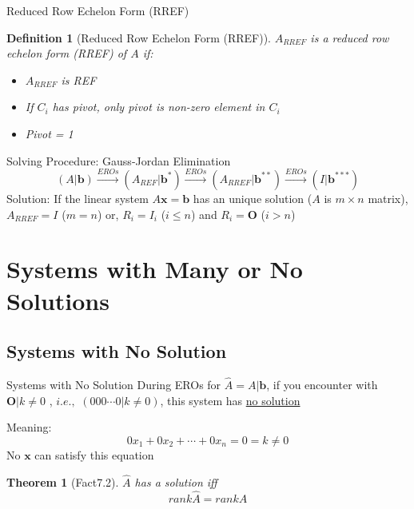 \documentclass[final]{beamer}
\newtheorem{defn}{Definition}
\newtheorem{thm}{Theorem}
\begin{document}
\begin{frame}[t]{Reduced Row Echelon Form (RREF)}
	\begin{defn}
		[Reduced Row Echelon Form (RREF)]
		$A_{RREF}$ is a reduced row echelon form (RREF) of $A$ if:
		\begin{itemize}
			\item $A_{RREF}$ is REF
			\item If $C_i$ has pivot, only pivot is non-zero element in $C_i$
			\item Pivot = 1
		\end{itemize}
	\end{defn}
	\begin{block}
		{Solving Procedure: Gauss-Jordan Elimination}
		\[
			(A\vert \mathbf{b}) \xrightarrow{EROs} (A_{REF}\vert \mathbf{b}^\ast) \xrightarrow{EROs} (A_{RREF}\vert \mathbf{b}^{\ast\ast}) \xrightarrow{EROs} (I|\mathbf{b}^{\ast\ast\ast})
		\]
		Solution: If the linear system $A\mathbf{x}=\mathbf{b}$ has an unique solution ($A$ is $m\times n$ matrix), $A_{RREF}=I$ ($m=n$) or, $R_i = I_i$ ($i\le n$) and $R_i = \mathbf{O} $ ($i>n$)
	\end{block}
\end{frame}
\section{Systems with Many or No Solutions} %
\label{sec:systems_with_many_or_no_solutions}
\subsection{Systems with No Solution} %
\label{sub:systems_with_no_solution}
\begin{frame}[t]{Systems with No Solution}
	During EROs for $\hat A = A\vert \mathbf{b}$, if you encounter with $ \mathbf{O}\vert k\neq 0$ , $i.e.,$ $(0 0 0\cdots 0\vert k\neq 0)$, this system has \uline{no solution} 
	
	Meaning: \[
		0 x_1 + 0 x_2 + \cdots + 0 x_n = 0 = k \neq 0 \tag{contradiction!}
	\]
	No $\mathbf{x}$ can satisfy this equation
	\begin{thm}
		[Fact7.2]
		$\hat A$ has a solution iff \[
			rank \hat A = rank A
		\]
	\end{thm}
\end{frame}
\end{document}

